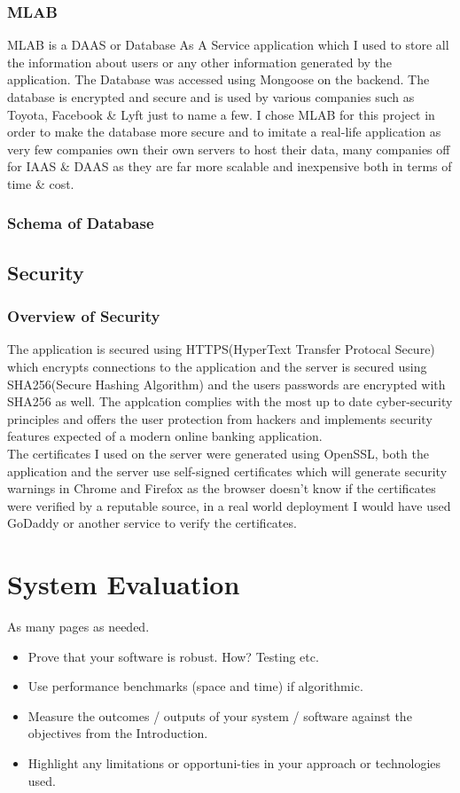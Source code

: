 \subsection{MLAB}
MLAB is a DAAS or Database As A Service application which I used to store all the information about users or any other information
generated by the application.  The Database was accessed using Mongoose on the backend.  The database is encrypted and secure and is used by
various companies such as Toyota, Facebook \& Lyft just to name a few.  I chose MLAB for this project in order to make the database more secure
and to imitate a real-life application as very few companies own their own servers to host their data, many companies off for IAAS \& DAAS as they are far more scalable and inexpensive both in terms of time \& cost.
\subsection{Schema of Database}
\section{Security}
\subsection{Overview of Security}
The application is secured using HTTPS(HyperText Transfer Protocal Secure) which encrypts connections to the application and the server
is secured using SHA256(Secure Hashing Algorithm) and the users passwords are encrypted with SHA256 as well.  The applcation complies with the most up to date cyber-security principles and offers the user protection from hackers and implements security features expected of a modern online banking application.
\\
The certificates I used on the server were generated using OpenSSL, both the application and the server use self-signed certificates which will generate security warnings in Chrome and Firefox as the browser doesn't know if the certificates were verified by a reputable source, in a real world deployment I would have used GoDaddy or another service to verify the certificates.
\chapter{System Evaluation}
As many pages as needed.
\begin{itemize}
\item Prove that your software is robust. How? Testing etc.
\item Use performance benchmarks (space and time) if algorithmic.
\item Measure the outcomes / outputs of your system / software against the objectives from the Introduction.
\item Highlight any limitations or opportuni-ties in your approach or technologies used.
\end{itemize}
